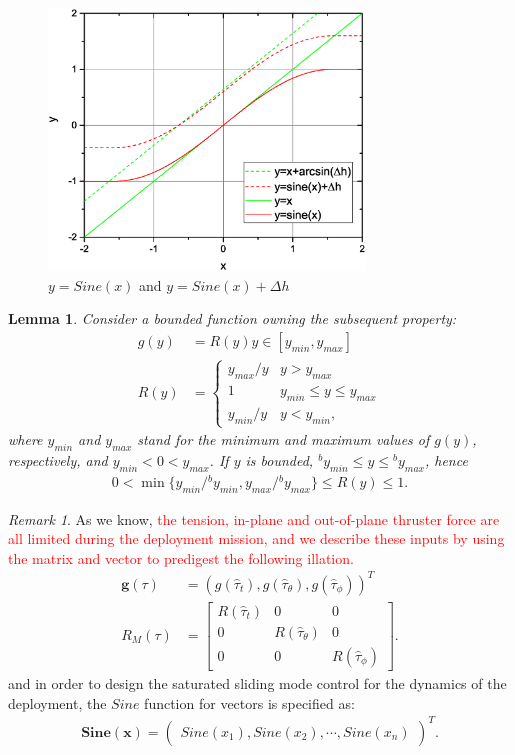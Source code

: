 \documentclass[3p]{elsarticle}
\theoremstyle{plain}
\newtheorem{mylem}{Lemma}
\theoremstyle{remark}
\newtheorem{myrem}{Remark}
\begin{document}
\begin{figure}
\centering
\includegraphics[width=0.75\textwidth]{paper4_fig2.eps}
\caption{$y =Sine(x)$ and $y=Sine(x)+\Delta h$}
\label{fig:2}
\end{figure}
\begin{mylem}\cite{Hu2008552}\label{lemma:2}
Consider a bounded function owning the subsequent property:
\begin{align}
g(y) &= R(y)y\in[y_{min},y_{max}]\\
R(y)&=\begin{cases}
y_{max}/y&y>y_{max}\\
1&y_{min}\le y\le y_{max}\\
y_{min}/y&y<y_{min},
\end{cases}
\end{align}
where $y_{min}$ and $y_{max}$ stand for the minimum and maximum values of $g(y)$, respectively, and $y_{min}<0<y_{max}$. If $y$ is bounded, $^by_{min}\le y\le{^by_{max}}$, hence
\begin{align}
0<\min\{y_{min}/{^by_{min}},y_{max}/{^by_{max}}\}\le R(y)\le 1.
\end{align}
\end{mylem}
\begin{myrem}
As we know, \textcolor{red}{the tension, in-plane and out-of-plane thruster force are all limited during the deployment mission, and we describe these inputs by using the matrix and vector to predigest the following illation.}
\begin{align}
\bm{g}(\tau) &= \left(g(\hat\tau_t),g(\hat\tau_\theta),g(\hat\tau_\phi)\right)^T\\
R_M(\tau) &= \begin{bmatrix}R(\hat\tau_t)&0&0\\0&R(\hat\tau_\theta)&0\\0&0&R(\hat\tau_\phi)\end{bmatrix}.
\end{align}
and in order to design the saturated sliding mode  control for the dynamics of the deployment, the $Sine$ function for vectors is specified as:
\begin{align}
\bm{Sine}(\bm x)=\begin{pmatrix}Sine(x_1),Sine(x_2),\cdots,Sine(x_n)\end{pmatrix}^T.
\end{align}
\end{myrem}
\end{document}
